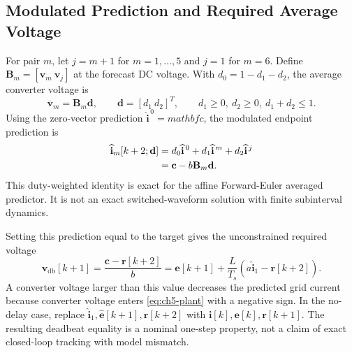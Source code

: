 \subsection{Modulated Prediction and Required Average Voltage}
For pair $m$, let $j=m+1$ for $m=1,\ldots,5$ and $j=1$ for $m=6$. Define $\mathbf B_m=[\mathbf v_m\ \mathbf v_j]$ at the forecast DC voltage. With $d_0=1-d_1-d_2$, the average converter voltage is
\begin{equation}
\overline{\mathbf v}_m=\mathbf B_m\mathbf d,\qquad
\mathbf d=[d_1\ d_2]^T,\qquad d_1\ge0,\ d_2\ge0,\ d_1+d_2\le1.
\label{eq:ch5-average-voltage}
\end{equation}
Using the zero-vector prediction $\widehat{\mathbf i}^{\,0}=mathbf c$, the modulated endpoint prediction is
\begin{align}
\widehat{\mathbf i}_m[k+2;\mathbf d]
&=d_0\widehat{\mathbf i}^{\,0}+d_1\widehat{\mathbf i}^{\,m}+d_2\widehat{\mathbf i}^{\,j}\notag\\
&=\mathbf c-b\mathbf B_m\mathbf d.
\label{eq:ch5-modulated-prediction}
\end{align}
This duty-weighted identity is exact for the affine Forward-Euler averaged predictor. It is not an exact switched-waveform solution with finite subinterval dynamics.

Setting this prediction equal to the target gives the unconstrained required voltage
\begin{equation}
\boxed{\mathbf v_{\mathrm{db}}[k+1]
=\frac{\mathbf c-\mathbf r[k+2]}{b}
=\widehat{\mathbf e}[k+1]+\frac{L}{T_s}
\left(a\widehat{\mathbf i}_1-\mathbf r[k+2]\right).}
\label{eq:ch5-deadbeat-voltage}
\end{equation}
A converter voltage larger than this value decreases the predicted grid current because converter voltage enters \eqref{eq:ch5-plant} with a negative sign. In the no-delay case, replace $\widehat{\mathbf i}_1,\widehat{\mathbf e}[k+1],\mathbf r[k+2]$ with $\mathbf i[k],\mathbf e[k],\mathbf r[k+1]$. The resulting deadbeat equality is a nominal one-step property, not a claim of exact closed-loop tracking with model mismatch.

